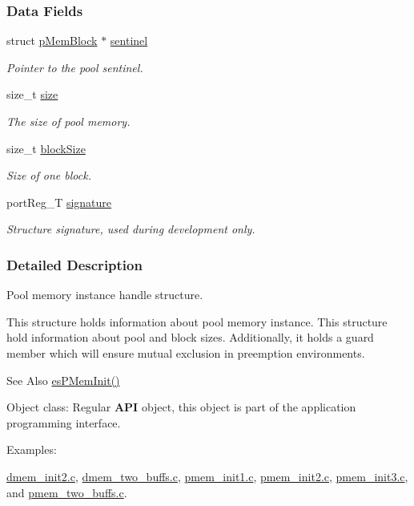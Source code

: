 \subsubsection*{Data Fields}
\begin{DoxyCompactItemize}
\item 
struct \hyperlink{structpMemBlock}{p\-Mem\-Block} $\ast$ \hyperlink{structesPMemHandle_a95b980208def4ca8c17c343aed282cd7}{sentinel}
\begin{DoxyCompactList}\small\item\em Pointer to the pool sentinel. \end{DoxyCompactList}\item 
size\-\_\-t \hyperlink{structesPMemHandle_a2ef5d8986c5e117c8ab5214e89ea021b}{size}
\begin{DoxyCompactList}\small\item\em The size of pool memory. \end{DoxyCompactList}\item 
size\-\_\-t \hyperlink{structesPMemHandle_a4498b86739feeabac46a7c2f457b3909}{block\-Size}
\begin{DoxyCompactList}\small\item\em Size of one block. \end{DoxyCompactList}\item 
port\-Reg\-\_\-\-T \hyperlink{structesPMemHandle_a16a84810e44eeed16fb9475f2f07001f}{signature}
\begin{DoxyCompactList}\small\item\em Structure signature, used during development only. \end{DoxyCompactList}\end{DoxyCompactItemize}


\subsubsection{Detailed Description}
Pool memory instance handle structure. 

This structure holds information about pool memory instance. {\ttfamily This} structure hold information about pool and block sizes. Additionally, it holds a guard member which will ensure mutual exclusion in preemption environments. \begin{DoxySeeAlso}{See Also}
\hyperlink{group__mem__intf_gac151cf4385488838b0507936e67e2584}{es\-P\-Mem\-Init()} 
\end{DoxySeeAlso}
\begin{DoxyParagraph}{Object class\-:}
Regular {\bfseries A\-P\-I} object, this object is part of the application programming interface. 
\end{DoxyParagraph}
\begin{Desc}
\item[Examples\-: ]\par
\hyperlink{dmem_init2_8c-example}{dmem\-\_\-init2.\-c}, \hyperlink{dmem_two_buffs_8c-example}{dmem\-\_\-two\-\_\-buffs.\-c}, \hyperlink{pmem_init1_8c-example}{pmem\-\_\-init1.\-c}, \hyperlink{pmem_init2_8c-example}{pmem\-\_\-init2.\-c}, \hyperlink{pmem_init3_8c-example}{pmem\-\_\-init3.\-c}, and \hyperlink{pmem_two_buffs_8c-example}{pmem\-\_\-two\-\_\-buffs.\-c}.\end{Desc}


